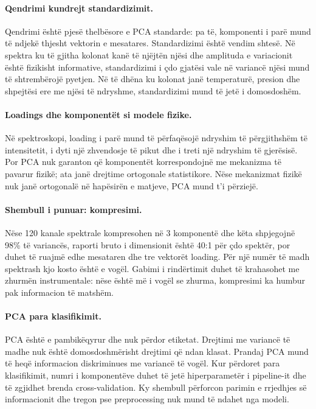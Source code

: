 \documentclass[12pt,a4paper,oneside]{book}
\begin{document}
\paragraph{Qendrimi kundrejt standardizimit.}
Qendrimi është pjesë thelbësore e PCA standarde: pa të, komponenti i parë mund të ndjekë thjesht vektorin e mesatares. Standardizimi është vendim shtesë. Në spektra ku të gjitha kolonat kanë të njëjtën njësi dhe amplituda e variacionit është fizikisht informative, standardizimi i çdo gjatësi vale në variancë njësi mund të shtrembërojë pyetjen. Në të dhëna ku kolonat janë temperaturë, presion dhe shpejtësi ere me njësi të ndryshme, standardizimi mund të jetë i domosdoshëm.

\paragraph{Loadings dhe komponentët si modele fizike.}
Në spektroskopi, loading i parë mund të përfaqësojë ndryshim të përgjithshëm të intensitetit, i dyti një zhvendosje të pikut dhe i treti një ndryshim të gjerësisë. Por PCA nuk garanton që komponentët korrespondojnë me mekanizma të pavarur fizikë; ata janë drejtime ortogonale statistikore. Nëse mekanizmat fizikë nuk janë ortogonalë në hapësirën e matjeve, PCA mund t'i përziejë.

\paragraph{Shembull i punuar: kompresimi.}
Nëse 120 kanale spektrale kompresohen në 3 komponentë dhe këta shpjegojnë 98\% të variancës, raporti bruto i dimensionit është 40:1 për çdo spektër, por duhet të ruajmë edhe mesataren dhe tre vektorët loading. Për një numër të madh spektrash kjo kosto është e vogël. Gabimi i rindërtimit duhet të krahasohet me zhurmën instrumentale: nëse është më i vogël se zhurma, kompresimi ka humbur pak informacion të matshëm.

\paragraph{PCA para klasifikimit.}
PCA është e pambikëqyrur dhe nuk përdor etiketat. Drejtimi me variancë të madhe nuk është domosdoshmërisht drejtimi që ndan klasat. Prandaj PCA mund të heqë informacion diskriminues me variancë të vogël. Kur përdoret para klasifikimit, numri i komponentëve duhet të jetë hiperparametër i pipeline-it dhe të zgjidhet brenda cross-validation. Ky shembull përforcon parimin e rrjedhjes së informacionit dhe tregon pse preprocessing nuk mund të ndahet nga modeli.
\end{document}

